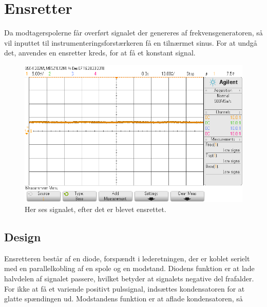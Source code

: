 \section{Ensretter}\label{sec:ensretter}
Da modtagerspolerne får overført signalet der genereres af frekvensgeneratoren, så vil inputtet til instrumenteringsforstærkeren få en tilnærmet sinus.
For at undgå det, anvendes en ensretter kreds, for at få et konstant signal.
\begin{figure}[h!]
	\centering
	\includegraphics[width=1\textwidth]{billeder/ensretter_png.png}
	\caption{Her ses signalet, efter det er blevet ensrettet.}
	\label{fig:filter_out}
\end{figure}

\subsection{Design}
Ensretteren består af en diode, forspændt i lederetningen, der er koblet serielt med en parallelkobling af en spole og en modstand. 
Diodens funktion er at lade halvdelen af signalet passere, hvilket betyder at signalets negative del frafalder. 
For ikke at få et variende positivt pulssignal, indsættes kondensatoren for at glatte spændingen ud. Modstandens funktion er at aflade kondensatoren, så


